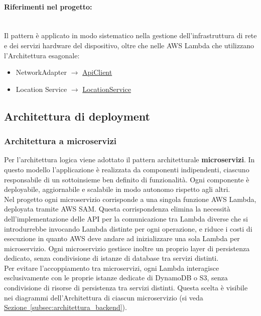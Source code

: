 \documentclass[a4paper,12pt]{article}
\newcommand{\code}[1]{{\ttfamily\textcolor{purple!85!black}{#1}}}
\begin{document}
\paragraph{Riferimenti nel progetto:}\mbox{}\\
Il pattern è applicato in modo sistematico nella gestione dell'infrastruttura di rete e dei servizi hardware del dispositivo, oltre che nelle AWS Lambda che utilizzano l'Architettura esagonale:
\begin{itemize}
	\item NetworkAdapter $\rightarrow$ \hyperref[DC-Chatbot]{\code{ApiClient}}
	\item Location Service $\rightarrow$ \hyperref[DC-LocationService]{\code{LocationService}}
\end{itemize}


\subsection{Architettura di deployment} \label{subsec:architettura_deployment}

\subsubsection{Architettura a microservizi}
Per l'architettura logica viene adottato il pattern architetturale \textbf{microservizi}. In questo modello l'applicazione è realizzata 
da componenti indipendenti, ciascuno responsabile di un sottoinsieme ben definito di funzionalità. Ogni componente è deployabile, aggiornabile e scalabile in modo autonomo rispetto agli altri.\\

Nel progetto ogni microservizio corrisponde a una singola funzione AWS Lambda, deployata tramite AWS SAM. Questa corrispondenza elimina la necessità dell'implementazione delle API per la 
comunicazione tra Lambda diverse che si introdurrebbe invocando Lambda distinte per ogni operazione, e riduce i costi di esecuzione in quanto AWS deve andare ad inizializzare una sola Lambda per microservizio. 
Ogni microservizio gestisce inoltre un proprio layer di persistenza dedicato, senza condivisione di istanze 
di database tra servizi distinti.\\

Per evitare l'accoppiamento tra microservizi, ogni Lambda interagisce esclusivamente con le proprie istanze dedicate di DynamoDB o S3, 
senza condivisione di risorse di persistenza tra servizi distinti. Questa scelta è visibile nei diagrammi dell'Architettura di ciascun 
microservizio (si veda \hyperref[subsec:architettura_backend]{Sezione~\ref*{subsec:architettura_backend}}).\\ 
\end{document}
